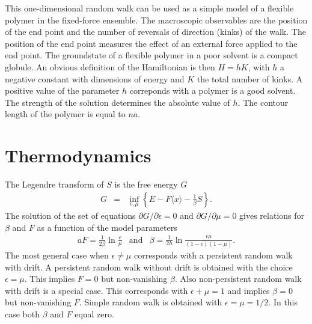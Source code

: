 \documentclass[doublecol,figures]{epl2}
\begin{document}
This one-dimensional random walk can be used as a simple
model of a flexible polymer in the fixed-force ensemble. The macroscopic
observables are the position of the end point and the number of reversals of
direction (kinks) of the walk. The position of the end point measures the effect
of an external force applied to the end point. The groundstate of a flexible
polymer in a poor solvent is a compact globule.  An obvious definition of the
Hamiltonian is then $H=hK$, with $h$ a negative constant with dimensions of
energy and $K$ the total number of kinks. A positive value of the parameter $h$ correponds with a polymer is a good solvent. The strength of the solution determines the absolute value of $h$. The contour length of the polymer is equal to $na$.

\section{Thermodynamics}
The Legendre transform of $S$ is the free energy $G$
\begin{eqnarray}\label{Legen}
G&=&\inf_{\epsilon,\mu}\left\{E-F\langle
x\rangle-\frac{1}{\beta}S\right\}.
\end{eqnarray}
The solution of the set of equations $\partial G/\partial\epsilon=0$ and
$\partial G/\partial\mu=0$ gives relations for $\beta$ and $F$ as a function of
the model parameters 
\begin{eqnarray}\label{connection_model_therm}
aF=\frac{1}{2\beta}\ln\frac\epsilon\mu&\textrm{and}&\beta=\frac{1}{2h}\ln\frac{
\epsilon\mu}{(1-\epsilon)(1-\mu)}.
\end{eqnarray}
The most general case when $\epsilon\neq\mu$ corresponds with a persistent
random walk with drift. A persistent random walk \cite{referee10bis} without drift is obtained with
the choice $\epsilon=\mu$. This implies $F=0$ but non-vanishing $\beta$. Also
non-persistent
random walk with drift is a special case. This corresponds with $\epsilon+\mu=1$
and implies
$\beta=0$ but non-vanishing $F$. Simple random walk is obtained with
$\epsilon=\mu=1/2$. In this case both $\beta$ and $F$ equal zero. 
\end{document}

